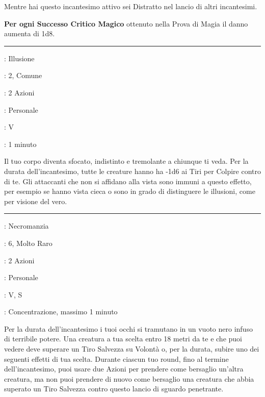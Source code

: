 \begin{multicols}{2}
Mentre hai questo incantesimo attivo sei Distratto nel lancio di altri incantesimi.

\textbf{Per ogni Successo Critico Magico} ottenuto nella Prova di Magia il danno aumenta di 1d8.

\smallskip\noindent\rule{\linewidth}{2pt} \hypertarget{Sfocatura}{}\medskip{}
\noindent
\begin{description}[noitemsep, topsep=0pt, parsep=0pt, partopsep=0pt, leftmargin=0cm, labelwidth=2.8cm]
	\item[\textbf{Lista di Magia}]: Illusione
	\item[\textbf{Livello}]: 2, Comune
	\item[\textbf{T. di Lancio}]: 2 Azioni
	\item[\textbf{Gittata}]: Personale
	\item[\textbf{Componenti}]: V
	\item[\textbf{Durata}]: 1 minuto
\end{description}

Il tuo corpo diventa sfocato, indistinto e tremolante a chiunque ti veda. Per la durata dell'incantesimo, tutte le creature hanno ha -1d6 ai Tiri per Colpire contro di te. Gli attaccanti che non si affidano alla vista sono immuni a questo effetto, per esempio se hanno vista cieca o sono in grado di distinguere le illusioni, come per visione del vero.

\smallskip\noindent\rule{\linewidth}{2pt} \hypertarget{Sguardo Penetrante}{}\medskip{}
\noindent
\begin{description}[noitemsep, topsep=0pt, parsep=0pt, partopsep=0pt, leftmargin=0cm, labelwidth=2.8cm]
	\item[\textbf{Lista di Magia}]: Necromanzia
	\item[\textbf{Livello}]: 6, Molto Raro
	\item[\textbf{T. di Lancio}]: 2 Azioni
	\item[\textbf{Gittata}]: Personale
	\item[\textbf{Componenti}]: V, S
	\item[\textbf{Durata}]: Concentrazione, massimo 1 minuto
\end{description}

Per la durata dell'incantesimo i tuoi occhi si tramutano in un vuoto nero infuso di terribile potere. Una creatura a tua scelta entro 18 metri da te e che puoi vedere deve superare un Tiro Salvezza su Volontà o, per la durata, subire uno dei seguenti effetti di tua scelta. Durante ciascun tuo round, fino al termine dell'incantesimo, puoi usare due Azioni per prendere come bersaglio un'altra creatura, ma non puoi prendere di nuovo come bersaglio una creatura che abbia superato un Tiro Salvezza contro questo lancio di sguardo penetrante.


\end{multicols}
